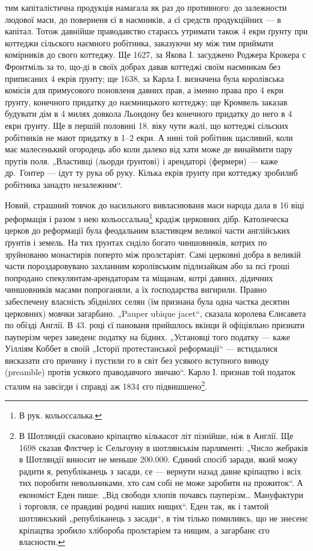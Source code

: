 \parcont{}
тим капіталістична продукція намагала як раз до противного: до залежности людової маси, до поверненя
єї в наємників, а єї средств продукційних — в капітал. Тотож давнійше праводавство стараєсь утримати
також 4 екри ґрунту при коттеджи сільского наємного робітника, заказуючи му між тим приймати
комірників до свого коттеджу. Ще 1627, за Якова І. засуджено Роджера Крокера с Фронтміль за то,
що-ді в своїх добрах давав коттеджі своїм наємникам без приписаних 4 екрів ґрунту; ще 1638, за Карла
І. визначена була королівська комісія для примусового поновленя давних прав, а іменно права про 4
екри ґрунту, конечного придатку до наємницького коттеджу; ще Кромвель заказав будувати дім в 4 милях
довкола Льондону без конечного придатку до него в 4 екри ґрунту. Ще в першій половині 18. віку чути
жалі, що коттеджі сільских робітників не мают придатку в 1--2 екри. А нині той робітник щасливий,
коли має малесенький огородець або коли далеко від хати може де винаймити пару прутів поля.
„Властивці (льорди ґрунтові) і арендаторі (фермери) — каже др.~Гонтер — ідут ту рука об руку. Кілька
екрів ґрунту при коттеджу зробилиб робітника занадто незалежним“.

Новий, страшний товчок до насильного вивласнюваня маси народа дала в 16 віці реформація і разом з
нею кольоссальна\footnote*{
В рук. кольоссалька.
} крадіж церковних дібр. Католическа церков до реформації була феодальним
властивцем великої части англійських ґрунтів і земель. На тих ґрунтах сиділо богато чиншовників,
котрих по зруйнованю монастирів поперто між пролєтаріят. Самі церковні добра в великій части
пороздаровувано захланним королівським підлизайкам або за псі гроші попродано
спекулянтам-арендаторам та міщанам, котрі давних, дідичних чиншовників масами попроганяли, а їх
ґосподарства вигирили. Правно забеспечену власність збіднілих селян (їм признана була одна частка
десятин церковних) мовчки загарбано. „Pauper ubique jacet“, сказала королева Єлисавета по обїзді
Англії. В 43. році єї панованя прийшлось вкінци й офіціяльно признати пауперізм через заведенє
податку на бідних. „Установці того податку
— каже Уілліям Коббет в своїй „Історії протестанської реформації“ — встидалися висказати єго причину
і пустили го в світ без усякого вступного виводу (preamble) протів усякого праводавчого звичаю“.
Карло І. признав той податок сталим на завсігди і справді аж 1834 єго підвишшено\footnote{
В Шотляндії скасовано кріпацтво кількасот літ пізнійше, ніж в Англії. Ще 1698 сказав Флєтчер іс
Сельгоуну в шотлянськім парляменті: „Число жебраків в Шотляндії виносит не меньше 200.000. Єдиний 
спосіб заради, який можу радити я, републіканець з засади, се — вернути
назад давне кріпацтво і всіх тих поробити невольниками, хто сам
собі не може заробити на прожиток“. А економіст Еден пише: „Від свободи
хлопів почавсь пауперізм\dots{} Мануфактури і торговля, се правдиві
родичі наших нищих“. Еден так, як і тамтой шотлянський „републіканець
з засади“, в тім тілько помиливсь, що не знесенє кріпацтва зробило хлібороба
пролєтаріем та нищим, а загарбанє єго власности.
}.
\par{}